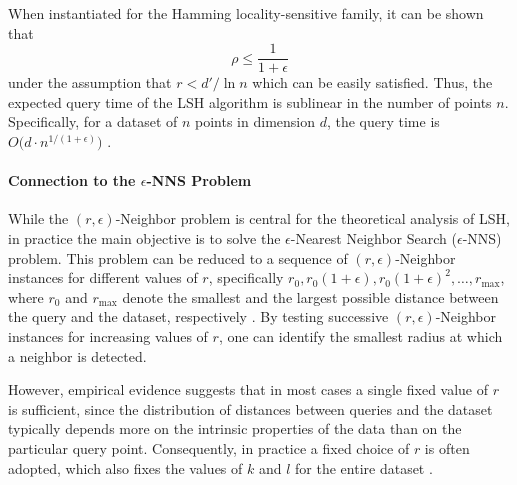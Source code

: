 When instantiated for the Hamming locality-sensitive family, it can be shown that
\[
\rho \le \frac{1}{1 + \epsilon}
\]
under the assumption that $r < d'/\ln n$ which can be easily satisfied. Thus, the expected query time of the LSH algorithm is sublinear in the number of points $n$. Specifically, for a dataset of $n$ points in dimension $d$, the query time is $O\bigl(d \cdot n^{1 / (1 + \epsilon)}\bigr)$ \cite{Gionis-Indyk-Motwani-1999}.

\paragraph{Connection to the $\epsilon$-NNS Problem}

While the $(r, \epsilon)$-Neighbor problem is central for the theoretical analysis of LSH, in practice the main objective is to solve the $\epsilon$-Nearest Neighbor Search ($\epsilon$-NNS) problem. This problem can be reduced to a sequence of $(r, \epsilon)$-Neighbor instances for different values of $r$, specifically $r_0, r_0(1 + \epsilon), r_0(1 + \epsilon)^2, \dots, r_{\max}$, where $r_0$ and $r_{\max}$ denote the smallest and the largest possible distance between the query and the dataset, respectively \cite{Gionis-Indyk-Motwani-1999}. By testing successive $(r, \epsilon)$-Neighbor instances for increasing values of $r$, one can identify the smallest radius at which a neighbor is detected.

However, empirical evidence suggests that in most cases a single fixed value of $r$ is sufficient, since the distribution of distances between queries and the dataset typically depends more on the intrinsic properties of the data than on the particular query point. Consequently, in practice a fixed choice of $r$ is often adopted, which also fixes the values of $k$ and $l$ for the entire dataset \cite{Gionis-Indyk-Motwani-1999}.